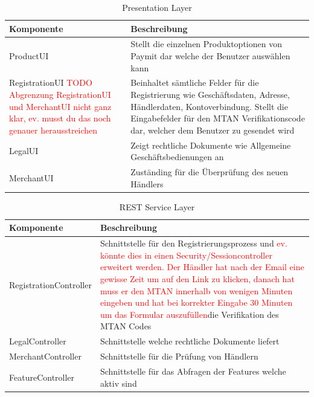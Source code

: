 \begin{table}[H]
	\centering
	\caption{Presentation Layer}
	\begin{tabular}{ | p{4cm} | p{12cm} | }
		\toprule
		{\textbf{Komponente}} & {\textbf{Beschreibung}} \\
		\midrule
		ProductUI &  Stellt die einzelnen Produktoptionen von Paymit dar welche der Benutzer auswählen kann\\ \hline
		RegistrationUI \textcolor{red}{TODO Abgrenzung RegistrationUI und MerchantUI nicht ganz klar, ev. musst du das noch genauer herausstreichen} &  Beinhaltet sämtliche Felder für die Registrierung wie  Geschäftsdaten, Adresse, Händlerdaten, Kontoverbindung. Stellt die Eingabefelder für den MTAN Verifikationscode dar, welcher dem Benutzer zu gesendet wird\\ \hline
		LegalUI &  Zeigt rechtliche Dokumente wie Allgemeine Geschäftsbedienungen an \\ \hline
		MerchantUI &  Zuständing für die Überprüfung des neuen Händlers\\
		\bottomrule
	\end{tabular}
\end{table}

\begin{table}[H]
	\centering
	\caption{REST Service Layer}
	\begin{tabular}{ | p{4cm} | p{12cm} | }
		\toprule
		{\textbf{Komponente}} & {\textbf{Beschreibung}} \\
		\midrule
		RegistrationController &  Schnittstelle für den Registrierungsprozess und \textcolor{red}{ev. könnte dies in einen Security/Sessioncontroller erweitert werden. Der Händler hat nach der Email eine gewisse Zeit um auf den Link zu klicken, danach hat muss er den MTAN innerhalb von wenigen Minuten eingeben und hat bei korrekter Eingabe 30 Minuten um das Formular auszufüllen}die Verifikation des MTAN Codes \\ \hline
		LegalController &  Schnittstelle welche rechtliche Dokumente liefert \\ \hline
		MerchantController &  Schnittstelle für die Prüfung von Händlern \\ \hline
		FeatureController & Schnittstelle für das Abfragen der Features welche aktiv sind \\
		\bottomrule
	\end{tabular}
\end{table}

